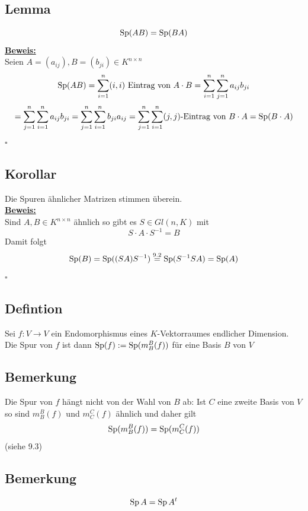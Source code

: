 \subsection{Lemma} %
\label{sub:lemma}
\[
	\operatorname{Sp} (A B) = \operatorname{Sp} (B A)
\]
\underline{\textbf{Beweis:}} \\
Seien $A= (a_{ij}), B= (b_{ji}) \in K^{n \times n}$
\[
	\operatorname{Sp} (A B) = \sum\limits_{i=1}^{n} (i,i) \text{ Eintrag von } A \cdot B = \sum\limits_{i=1}^{n} \sum\limits_{j=1}^{n} a_{ij} b_{ji}
\]
\[
	= \sum\limits_{j=1}^{n} \sum\limits_{i=1}^{n} a_{ij} b_{ji} = \sum\limits_{j=1}^{n} \sum\limits_{i=1}^{n} b_{ji} a_{ij} = \sum\limits_{j=1}^{n} \sum\limits_{i=1}^{n} 
	(j,j)\text{-Eintrag von } B \cdot A = \operatorname{Sp}(B \cdot A)
\]
\hfill \( \square \)

\subsection{Korollar} %
\label{sub:korollar}
Die Spuren ähnlicher Matrizen stimmen überein. 
\vspace{10pt} \\
\underline{\textbf{Beweis:}} \\
Sind $A,B \in K^{n \times n}$ ähnlich so gibt es $S \in Gl(n,K)$ mit 
\[
	S \cdot A \cdot S ^{-1} = B
\]
Damit folgt 
\[
	\operatorname{Sp} (B) = \operatorname{Sp} ( ( SA) S ^{-1}) \overset{9.2}{=} \operatorname{Sp} (S ^{-1} SA) = \operatorname{Sp} (A) 
\]
\hfill \( \square \)

\subsection{Defintion} %
\label{sub:defintion}
Sei $f: V \to V$ ein Endomorphismus eines \(K\)-Vektorraumes endlicher Dimension. Die Spur von $f$ ist dann $\operatorname{Sp} (f) := \operatorname{Sp} ( m_B^B(f))$ für eine Basis $B$ von $V$

\subsection{Bemerkung} %
\label{sub:bemerkung}
Die Spur von $f$ hängt nicht von der Wahl von $B$ ab: Ist $C$ eine zweite Basis von $V$ so sind $m_B^B(f)$ und $m_C^C (f)$ ähnlich und daher gilt
\[
	\operatorname{Sp} (m_B^B (f)) = \operatorname{Sp} (m_C^C(f)) 
\]
(siehe 9.3)

\subsection{Bemerkung} %
\label{sub:bemerkung}
\[
	\operatorname{Sp} A = \operatorname{Sp} A^t 
\]

